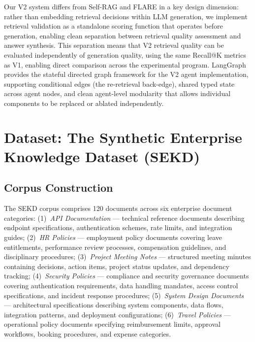 \documentclass[11pt, a4paper]{article}
\begin{document}
Our V2 system differs from Self-RAG and FLARE in a key design dimension: rather than embedding retrieval decisions within LLM generation, we implement retrieval validation as a standalone scoring function that operates before generation, enabling clean separation between retrieval quality assessment and answer synthesis. This separation means that V2 retrieval quality can be evaluated independently of generation quality, using the same Recall@K metrics as V1, enabling direct comparison across the experimental program. LangGraph \citep{langgraph2024} provides the stateful directed graph framework for the V2 agent implementation, supporting conditional edges (the re-retrieval back-edge), shared typed state across agent nodes, and clean agent-level modularity that allows individual components to be replaced or ablated independently.

\section{Dataset: The Synthetic Enterprise Knowledge Dataset (SEKD)}
\label{sec:dataset}

\subsection{Corpus Construction}

The SEKD corpus comprises 120 documents across six enterprise document categories: (1)~\textit{API Documentation} --- technical reference documents describing endpoint specifications, authentication schemes, rate limits, and integration guides; (2)~\textit{HR Policies} --- employment policy documents covering leave entitlements, performance review processes, compensation guidelines, and disciplinary procedures; (3)~\textit{Project Meeting Notes} --- structured meeting minutes containing decisions, action items, project status updates, and dependency tracking; (4)~\textit{Security Policies} --- compliance and security governance documents covering authentication requirements, data handling mandates, access control specifications, and incident response procedures; (5)~\textit{System Design Documents} --- architectural specifications describing system components, data flows, integration patterns, and deployment configurations; (6)~\textit{Travel Policies} --- operational policy documents specifying reimbursement limits, approval workflows, booking procedures, and expense categories.
\end{document}
